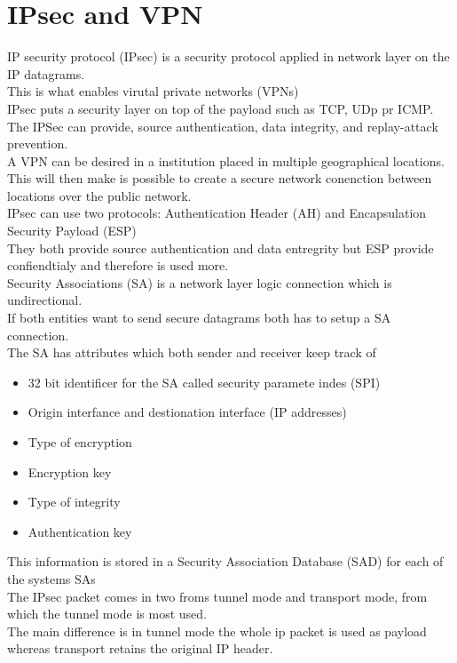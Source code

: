 \documentclass[12pt, a4paper]{article}
\begin{document}
	\section{IPsec and VPN}
		IP security protocol (IPsec) is a security protocol applied in network layer on the IP datagrams.\\
		This is what enables virutal private networks (VPNs)\\
		IPsec puts a security layer on top of the payload such as TCP, UDp pr ICMP.\\
		The IPSec can provide, source authentication, data integrity, and replay-attack prevention.\\
		A VPN can be desired in a institution placed in multiple geographical locations.\\
		This will then make is possible to create a secure network conenction between locations over the public network.\\
		IPsec can use two protocols: Authentication Header (AH) and Encapsulation Security Payload (ESP)\\
		They both provide source authentication and data entregrity but ESP provide confiendtialy and therefore is used more.\\
		Security Associations (SA) is a network layer logic connection which is undirectional.\\
		If both entities want to send secure datagrams both has to setup a SA connection.\\
		The SA has attributes which both sender and receiver keep track of
		\begin{itemize}
			\item 32 bit identificer for the SA called security paramete indes (SPI)
			\item Origin interfance and destionation interface (IP addresses)
			\item Type of encryption
			\item Encryption key
			\item Type of integrity
			\item Authentication key
		\end{itemize}
		This information is stored in a Security Association Database (SAD) for each of the systems SAs\\
		The IPsec packet comes in two froms tunnel mode and transport mode, from which the tunnel mode is most used.\\
		The main difference is in tunnel mode the whole ip packet is used as payload whereas transport retains the original IP header.\\
\end{document}

